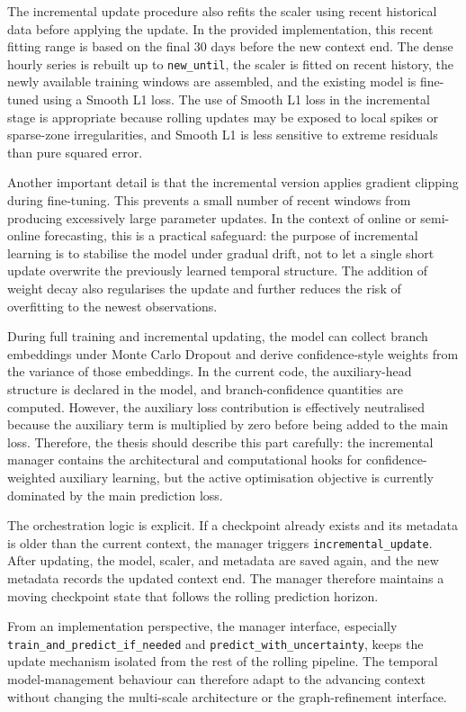 \documentclass[12pt,a4paper]{report}
\begin{document}
	The incremental update procedure also refits the scaler using recent historical data before applying the update. In the provided implementation, this recent fitting range is based on the final 30 days before the new context end. The dense hourly series is rebuilt up to \texttt{new\_until}, the scaler is fitted on recent history, the newly available training windows are assembled, and the existing model is fine-tuned using a Smooth L1 loss. The use of Smooth L1 loss in the incremental stage is appropriate because rolling updates may be exposed to local spikes or sparse-zone irregularities, and Smooth L1 is less sensitive to extreme residuals than pure squared error.
	
	Another important detail is that the incremental version applies gradient clipping during fine-tuning. This prevents a small number of recent windows from producing excessively large parameter updates. In the context of online or semi-online forecasting, this is a practical safeguard: the purpose of incremental learning is to stabilise the model under gradual drift, not to let a single short update overwrite the previously learned temporal structure. The addition of weight decay also regularises the update and further reduces the risk of overfitting to the newest observations.
	
	During full training and incremental updating, the model can collect branch embeddings under Monte Carlo Dropout and derive confidence-style weights from the variance of those embeddings. In the current code, the auxiliary-head structure is declared in the model, and branch-confidence quantities are computed. However, the auxiliary loss contribution is effectively neutralised because the auxiliary term is multiplied by zero before being added to the main loss. Therefore, the thesis should describe this part carefully: the incremental manager contains the architectural and computational hooks for confidence-weighted auxiliary learning, but the active optimisation objective is currently dominated by the main prediction loss.
	
	The orchestration logic is explicit. If a checkpoint already exists and its metadata is older than the current context, the manager triggers \texttt{incremental\_update}. After updating, the model, scaler, and metadata are saved again, and the new metadata records the updated context end. The manager therefore maintains a moving checkpoint state that follows the rolling prediction horizon.
	
	From an implementation perspective, the manager interface, especially \texttt{train\_and\_predict\_if\_needed} and \texttt{predict\_with\_uncertainty}, keeps the update mechanism isolated from the rest of the rolling pipeline. The temporal model-management behaviour can therefore adapt to the advancing context without changing the multi-scale architecture or the graph-refinement interface.
	
\end{document}
